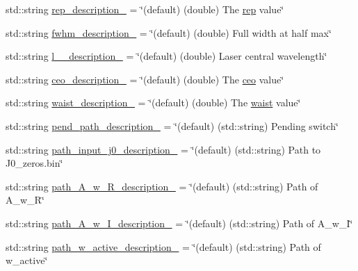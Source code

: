 \begin{DoxyCompactItemize}
\item 
std\+::string \hyperlink{class_config___settings_ac885ade71abffd480f1324d67438daff}{rep\+\_\+description\+\_\+} = \char`\"{}(default) (double) The \hyperlink{class_config___settings_a2d7cd824c2d98ef18359a062a802dca5}{rep} value\char`\"{}
\item 
std\+::string \hyperlink{class_config___settings_a79ea5af7b0bdaba77a061d5f407e7f19}{fwhm\+\_\+description\+\_\+} = \char`\"{}(default) (double) Full width at half max\char`\"{}
\item 
std\+::string \hyperlink{class_config___settings_a04bc9c9966974183a306593a492644f4}{l\+\_\+\_\+description\+\_\+} = \char`\"{}(default) (double) Laser central wavelength\char`\"{}
\item 
std\+::string \hyperlink{class_config___settings_a3e00769ffcd7bef60f9b5cb4c17d3c12}{ceo\+\_\+description\+\_\+} = \char`\"{}(default) (double) The \hyperlink{class_config___settings_ae8c68e62cdb5567405e82a77ae822ed1}{ceo} value\char`\"{}
\item 
std\+::string \hyperlink{class_config___settings_aa23531b1d4459fa9a2f2ae8132e32e30}{waist\+\_\+description\+\_\+} = \char`\"{}(default) (double) The \hyperlink{class_config___settings_a9bec079708e647e77006394d68ea3ad3}{waist} value\char`\"{}
\item 
std\+::string \hyperlink{class_config___settings_a6f8f961fb92591750f397fbaeca57dfd}{pend\+\_\+path\+\_\+description\+\_\+} = \char`\"{}(default) (std\+::string) Pending switch\char`\"{}
\item 
std\+::string \hyperlink{class_config___settings_a8370a038f54438143863503ffbe01581}{path\+\_\+input\+\_\+j0\+\_\+description\+\_\+} = \char`\"{}(default) (std\+::string) Path to J0\+\_\+zeros.\+bin\char`\"{}
\item 
std\+::string \hyperlink{class_config___settings_ae6815056b314b7e966494f3401dbdbd5}{path\+\_\+\+A\+\_\+w\+\_\+\+R\+\_\+description\+\_\+} = \char`\"{}(default) (std\+::string) Path of A\+\_\+w\+\_\+R\char`\"{}
\item 
std\+::string \hyperlink{class_config___settings_aa4ed53f65ab9ae16d18532d96c635748}{path\+\_\+\+A\+\_\+w\+\_\+\+I\+\_\+description\+\_\+} = \char`\"{}(default) (std\+::string) Path of A\+\_\+w\+\_\+I\char`\"{}
\item 
std\+::string \hyperlink{class_config___settings_a3fd26ef0593e50a4ea8249f9bcd9a94f}{path\+\_\+w\+\_\+active\+\_\+description\+\_\+} = \char`\"{}(default) (std\+::string) Path of w\+\_\+active\char`\"{}
\item 

\end{DoxyCompactItemize}
